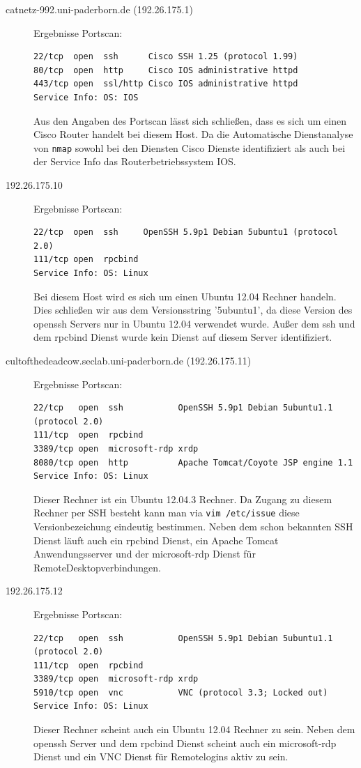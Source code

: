 \documentclass[10pt,a4paper]{article}
\begin{document}
\begin{description}
	\item[catnetz-992.uni-paderborn.de (192.26.175.1)] Ergebnisse Portscan:
	\begin{verbatim}
22/tcp  open  ssh      Cisco SSH 1.25 (protocol 1.99)
80/tcp  open  http     Cisco IOS administrative httpd
443/tcp open  ssl/http Cisco IOS administrative httpd
Service Info: OS: IOS
	\end{verbatim}
Aus den Angaben des Portscan lässt sich schließen, dass es sich um einen Cisco Router handelt bei diesem Host. Da die Automatische Dienstanalyse von \texttt{nmap} sowohl bei den Diensten Cisco Dienste identifiziert als auch bei der Service Info das Routerbetriebssystem IOS. 

	\item[192.26.175.10] Ergebnisse Portscan:
	\begin{verbatim}
22/tcp  open  ssh     OpenSSH 5.9p1 Debian 5ubuntu1 (protocol 2.0)
111/tcp open  rpcbind
Service Info: OS: Linux
	\end{verbatim}
Bei diesem Host wird es sich um einen Ubuntu 12.04 Rechner handeln. Dies schließen wir aus dem Versionsstring '5ubuntu1', da diese Version des openssh Servers nur in Ubuntu 12.04 verwendet wurde. Außer dem ssh und dem rpcbind Dienst wurde kein Dienst auf diesem Server identifiziert.

	\item[cultofthedeadcow.seclab.uni-paderborn.de (192.26.175.11)] Ergebnisse Portscan:
	\begin{verbatim}
22/tcp   open  ssh           OpenSSH 5.9p1 Debian 5ubuntu1.1 (protocol 2.0)
111/tcp  open  rpcbind
3389/tcp open  microsoft-rdp xrdp
8080/tcp open  http          Apache Tomcat/Coyote JSP engine 1.1
Service Info: OS: Linux
	\end{verbatim}
Dieser Rechner ist ein Ubuntu 12.04.3 Rechner. Da Zugang zu diesem Rechner per SSH besteht kann man via \texttt{vim /etc/issue} diese Versionbezeichung eindeutig bestimmen. Neben dem schon bekannten SSH Dienst läuft auch ein rpcbind Dienst, ein Apache Tomcat Anwendungsserver und der microsoft-rdp Dienst für RemoteDesktopverbindungen.

	\item[192.26.175.12] Ergebnisse Portscan:
	\begin{verbatim}
22/tcp   open  ssh           OpenSSH 5.9p1 Debian 5ubuntu1.1 (protocol 2.0)
111/tcp  open  rpcbind
3389/tcp open  microsoft-rdp xrdp
5910/tcp open  vnc           VNC (protocol 3.3; Locked out)
Service Info: OS: Linux
	\end{verbatim}
Dieser Rechner scheint auch ein Ubuntu 12.04 Rechner zu sein. Neben dem openssh Server und dem rpcbind Dienst scheint auch ein microsoft-rdp Dienst und ein VNC Dienst für Remotelogins aktiv zu sein.


\end{description}
\end{document}
